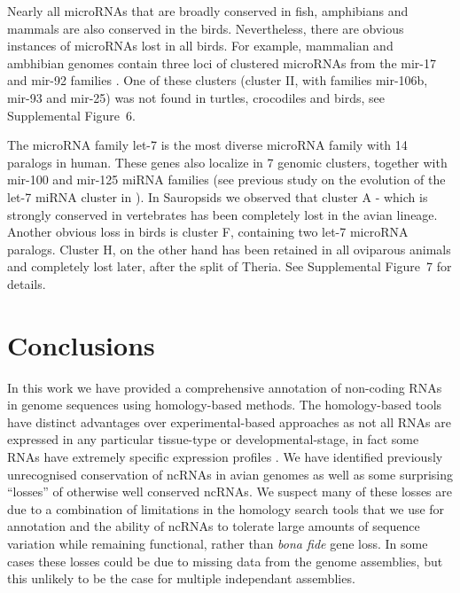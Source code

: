 \documentclass[10pt]{bmc_article}
\newenvironment{bmcformat}{\begin{raggedright}\baselineskip20pt\sloppy\setboolean{publ}{false}}{\end{raggedright}\baselineskip20pt\sloppy}
\begin{document}
\begin{bmcformat}

Nearly all microRNAs that are broadly conserved in fish, amphibians and
mammals are also conserved in the birds. Nevertheless, there are obvious
instances of microRNAs lost in all birds. For example, mammalian and
ambhibian genomes contain three loci of clustered microRNAs from the mir-17
and mir-92 families \cite{Tanzer:04}. One of these clusters (cluster II,
with families mir-106b, mir-93 and mir-25) was not found in turtles,
crocodiles and birds, see Supplemental Figure~6.

The microRNA family let-7 is the most diverse microRNA family with 14
paralogs in human. These genes also localize in 7 genomic clusters,
together with mir-100 and mir-125 miRNA families (see previous study on the
evolution of the let-7 miRNA cluster in \cite{Hertel:2012}). In Sauropsids
we observed that cluster A - which is strongly conserved in vertebrates has
been completely lost in the avian lineage. Another obvious loss in birds is
cluster F, containing two let-7 microRNA paralogs. Cluster H, on the other
hand has been retained in all oviparous animals and completely lost later,
after the split of Theria. See Supplemental Figure~7 for details.

\section*{Conclusions}


In this work we have provided a comprehensive annotation of non-coding
RNAs in genome sequences using homology-based methods. The
homology-based tools have distinct advantages over experimental-based
approaches as not all RNAs are expressed in any particular tissue-type
or developmental-stage, in fact some RNAs have extremely specific
expression profiles \cite{Johnston:2003}.  We have identified
previously unrecognised conservation of ncRNAs in avian genomes as
well as some surprising ``losses'' of otherwise well conserved
ncRNAs. We suspect many of these losses are due to a combination of
limitations in the homology search tools that we use for annotation
and the ability of ncRNAs to tolerate large amounts of sequence
variation while remaining functional, rather than \emph{bona fide}
gene loss. In some cases these losses could be due to missing data
from the genome assemblies, but this unlikely to be the case for
multiple independant assemblies.


\end{bmcformat}
\end{document}
